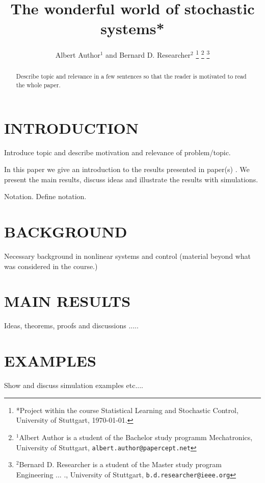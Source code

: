 \documentclass[letterpaper, 10 pt, conference]{ieeeconf}  %
\title{\LARGE \bf
The wonderful world of stochastic systems*
}
\author{Albert Author$^{1}$ and Bernard D. Researcher$^{2}$%
\thanks{*Project within the course Statistical Learning and Stochastic Control, University of Stuttgart, \today.}%
\thanks{$^{1}$Albert Author is a student of the Bachelor study programm Mechatronics, University of Stuttgart,
        {\tt\small albert.author@papercept.net}}%
\thanks{$^{2}$Bernard D. Researcher is a student of the Master study program Engineering ... ., University of Stuttgart,
        {\tt\small b.d.researcher@ieee.org}}%
}
\begin{document}
\maketitle
\thispagestyle{empty}
\pagestyle{empty}


\begin{abstract}

Describe topic and relevance in a few sentences so that the reader is motivated to
read the whole paper.

\end{abstract}


\section{INTRODUCTION}

Introduce topic and describe motivation and relevance of problem/topic.

In this paper we give an introduction to the results presented in paper(s) \cite{Bro-14}.
We present the main results, discuss ideas and illustrate the results with simulations.

Notation. Define notation.

\section{BACKGROUND}

Necessary background in nonlinear systems and control (material beyond what was
considered in the course.)


\section{MAIN RESULTS}

Ideas, theorems, proofs and discussions .....


\section{EXAMPLES}

Show and discuss simulation examples etc....
\end{document}
